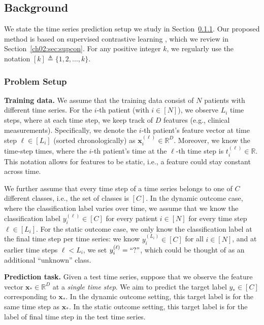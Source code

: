 \subsection{Background}
\label{ch02:sec:background}

We state the time series prediction setup we study in Section~\ref{ch02:sec:problem-setup}.
Our proposed method is based on supervised contrastive learning \citep{khosla2020supervised}, which we review in Section~\ref{ch02:sec:supcon}.
For any positive integer $k$, we regularly use the notation $[k]\triangleq \{1,2,\dots,k\}$.


\subsubsection{Problem Setup}
\label{ch02:sec:problem-setup}


\noindent
\textbf{Training data.}
We assume that the training data consist of $N$ patients with different time series.
For the \mbox{$i$-th} patient (with $i\in[N]$), we observe $L_i$ time steps, where at each time step, we keep track of $D$ features (e.g., clinical measurements).
Specifically, we denote the \mbox{$i$-th} patient's feature vector at time step $\ell\in[L_i]$ (sorted chronologically) as $\mathbf{x}_i^{(\ell)}\in\mathbb{R}^{D}$. 
Moreover, we know the time-step times, where the \mbox{$i$-th} patient's time at the $\ell$-th time step is $t_i^{(\ell)}\in\mathbb{R}$.
This notation allows for features to be static, i.e., a feature could stay constant across time.

We further assume that every time step of a time series belongs to one of $C$ different classes, i.e., the set of classes is $[C]$.
In the dynamic outcome case, where the classification label varies over time, we assume that we know the classification label $y_i^{(\ell)}\in[C]$ for every patient
$i\in[N]$ for every time step $\ell\in[L_i]$.
For the static outcome case, we only know the classification label at the final time step per time series: we know $y_i^{(L_i)}\in[C]$ for all $i\in[N]$, and at earlier time steps $\ell < L_i$, we set $y_i^{(\ell)}=``?"$, which could be thought of as an additional ``unknown'' class.


\noindent
\textbf{Prediction task.} Given a test time series, suppose that we observe the feature vector $\mathbf{x}_*\in\mathbb{R}^{D}$ at a \emph{single time step}. We aim to predict the target label $y_*\in[C]$ corresponding to $\mathbf{x}_*$. In the dynamic outcome setting, this target label is for the same time step as $\mathbf{x}_*$. In the static outcome setting, this target label is for the label of final time step in the test time series.

